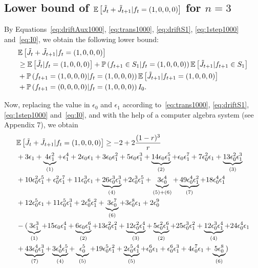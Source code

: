 \documentclass[11pt]{article}
\theoremstyle{plain}
\theoremstyle{definition}
\theoremstyle{remark}
\newcommand{\prob}[1]{\mathbb{P}\left( #1 \right)}
\newcommand{\esp}[1]{\mathbb{E}\left[ #1 \right]}
\begin{document}
\subsection{Lower bound of $\esp{\Tilde{J}_{t} + \Tilde{J}_{t+1} | f_t = (1,0,0,0)}$ for $n=3$} \label{sec:lb2n31000}
By Equations~\eqref{eq:driftAux1000}, \eqref{eq:trans1000}, \eqref{eq:driftS1}, \eqref{eq:1step1000} and~\eqref{eq:I0}, we obtain the following lower bound:
\begin{align*}
& \esp{\Tilde{J}_{t} + \Tilde{J}_{t+1}|f_t=(1,0,0,0)}\\
& \geq \esp{\Tilde{J}_{t}|f_t=(1,0,0,0)} + \prob{f_{t+1} \in S_1 |f_t=(1,0,0,0)} \esp{\Tilde{J}_{t+1}|f_{t+1}\in S_1} \nonumber \\
    & + \prob{f_{t+1}=(1,0,0,0) |f_t=(1,0,0,0)} \esp{\Tilde{J}_{t+1}|f_{t+1}=(1,0,0,0)} \nonumber \\
    & + \prob{f_{t+1}=(0,0,0,0) |f_t=(1,0,0,0)} I_0.
\end{align*}

Now, replacing the value in $\epsilon_0$ and $\epsilon_1$ according to~\eqref{eq:trans1000}, \eqref{eq:driftS1}, \eqref{eq:1step1000} and~\eqref{eq:I0}, and with the help of a computer algebra system (see Appendix 7), we obtain
\begin{align*}
& \esp{\Tilde{J}_{t} + \Tilde{J}_{t+1}|f_t=(1,0,0,0)} \geq -2+ 2 \frac{(1-r)^3}{r}\\
& + 3 \epsilon_1 + \underbrace{4 \epsilon_1^2}_{(1)} + \epsilon_1^4 + 2 \epsilon_0 \epsilon_1 + 3 \epsilon_0 \epsilon_1^2 + 5 \epsilon_0 \epsilon_1^3 + \underbrace{14 \epsilon_0 \epsilon_1^5}_{(2)} + \epsilon_0 \epsilon_1^7 + 7 \epsilon_0^2 \epsilon_1 + \underbrace{13 \epsilon_0^2 \epsilon_1^3}_{(3)} \\
& + 10 \epsilon_0^2 \epsilon_1^5 + \epsilon_0^2 \epsilon_1^7 + 11 \epsilon_0^3 \epsilon_1 + \underbrace{26 \epsilon_0^3 \epsilon_1^3}_{(4)} + 2 \epsilon_0^3 \epsilon_1^5 + \underbrace{3 \epsilon_0^4}_{(5)+(6)} + \underbrace{49 \epsilon_0^4 \epsilon_1^2}_{(7)} +18 \epsilon_0^4 \epsilon_1^4\\
& + 12 \epsilon_0^5 \epsilon_1 + 11 \epsilon_0^5 \epsilon_1^3 + 2 \epsilon_0^6 \epsilon_1^2 + \underbrace{3 \epsilon_0^7}_{(6)} + 3 \epsilon_0^8 \epsilon_1 + 2 \epsilon_0^9 \\
& - (\underbrace{3 \epsilon_1^3}_{(1)} + 15 \epsilon_0 \epsilon_1^4 + \underbrace{6 \epsilon_0 \epsilon_1^6}_{(2)} +13 \epsilon_0^2 \epsilon_1^2 + \underbrace{12 \epsilon_0^2 \epsilon_1^4}_{(3)} + \underbrace{5 \epsilon_0^2 \epsilon_1^6}_{(2)} + 25 \epsilon_0^3 \epsilon_1^2 +\underbrace{12 \epsilon_0^3 \epsilon_1^4}_{(4)} + 24 \epsilon_0^4 \epsilon_1\\
& +\underbrace{43 \epsilon_0^4 \epsilon_1^3}_{(7)} + \underbrace{3 \epsilon_0^4 \epsilon_1^5}_{(4)} + \underbrace{\epsilon_0^5}_{(5)} + 19 \epsilon_0^5 \epsilon_1^2 + \underbrace{2 \epsilon_0^5 \epsilon_1^4}_{(5)} + \epsilon_0^6 \epsilon_1 + \epsilon_0^6 \epsilon_1^3 + 4 \epsilon_0^7 \epsilon_1 + \underbrace{5 \epsilon_0^8}_{(6)} )
\end{align*}
\end{document}

